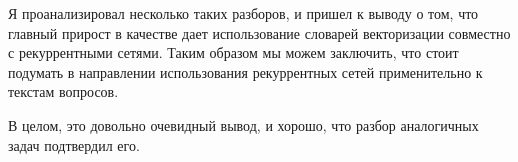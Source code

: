 Я проанализировал несколько таких разборов, и пришел к выводу о том, что главный прирост в качестве дает использование словарей векторизации совместно с рекуррентными сетями. Таким образом мы можем заключить, что стоит подумать в направлении использования рекуррентных сетей применительно к текстам вопросов.

В целом, это довольно очевидный вывод, и хорошо, что разбор аналогичных задач подтвердил его.



\pagebreak





